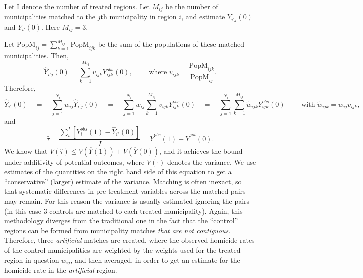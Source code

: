 \documentclass{article}[11 pt]
\begin{document}
Let I denote the number of treated regions. Let $M_{ij}$ be the number of municipalities matched to the $j$th municipality in region $i$, and estimate $Y_{i'j}(0)$ and $Y_{i'}(0)$. Here $M_{ij}=3$.

      Let $\textrm{PopM}_{ij}=\sum_{k=1}^{M_{ij}}\textrm{PopM}_{ijk}$ be the sum of the populations of these matched municipalities. %
 Then,
      $$\hat{Y}_{i'j}(0) =\sum_{k=1}^{M_{ij}}v_{ijk}Y^{obs}_{ijk}(0),\quad \quad \textrm{ where } v_{ijk}=\frac{\textrm{PopM}_{ijk}}{\textrm{PopM}_{ij}}.$$
      Therefore,
      $$\hat{Y}_{i'}(0) \quad =\quad \sum_{j=1}^{N_i}w_{ij}\hat{Y}_{i'j}(0)\quad =\quad\sum_{j=1}^{N_i}w_{ij}\sum_{k=1}^{M_{ij}}v_{ijk}Y^{obs}_{ijk}(0)\quad =\quad
      \sum_{j=1}^{N_i}\sum_{k=1}^{M_{ij}}\tilde{w}_{ijk}Y^{obs}_{ijk}(0) \quad \quad \textrm{ with } \tilde{w}_{ijk} = w_{ij}v_{ijk}, $$
      and
      $$\hat{\tau}=\frac{\sum_i^{I}[Y^{obs}_i(1) - \hat{Y}_{i'}(0)]}{I}=\overline{Y}^{obs}(1)-\overline{Y}^{est}(0).$$
      We know that $V(\hat{\tau})\leq V(\overline{Y}(1))+V(\overline{Y}(0))$, %
and it achieves the bound under additivity of potential outcomes, where $V(\cdot)$ denotes the variance. We use estimates of the quantities on the right hand side of this equation to get a ``conservative'' (larger) estimate of the variance. Matching is often inexact, so that systematic differences in pre-treatment variables across the matched pairs may remain. For this reason the variance is usually estimated ignoring the pairs (in this case 3 controls are matched to each treated municipality). Again, this methodology diverges from the traditional one in the fact that the ``control'' regions can be formed from municipality matches \emph{that are not contiguous}. Therefore, three \emph{artificial} matches are created, where the observed homicide rates of the control municipalities are weighted by the weights used for the treated region in question $w_{ij}$, and then averaged, in order to get an estimate for the homicide rate in the \emph{artificial} region. 

\end{document}
